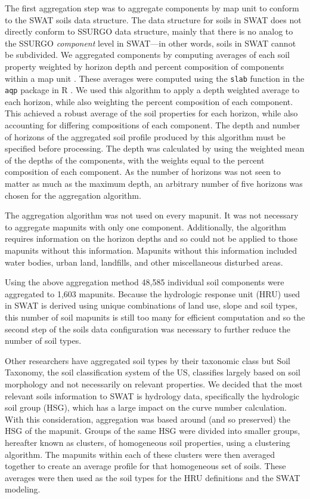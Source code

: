 The first aggregation step was to aggregate components by map unit to conform to
the SWAT soils data structure. The data structure for soils in SWAT does not
directly conform to SSURGO data structure, mainly that there is no analog to the
SSURGO \textit{component} level in SWAT---in other words, soils in SWAT cannot
be subdivided. We aggregated components by computing averages of each soil
property weighted by horizon depth and percent composition of components within
a map unit \cite{gatzke_aggregation_2011, beaudette_algorithms_2013}. These
averages were computed using the \texttt{slab} function in the \texttt{aqp}
package in R \cite{beaudette_algorithms_2013}. We used this algorithm to apply a
depth weighted average to each horizon, while also weighting the percent
composition of each component. This achieved a robust average of the soil
properties for each horizon, while also accounting for differing compositions of
each component. The depth and number of horizons of the aggregated soil profile
produced by this algorithm must be specified before processing. The depth was
calculated by using the weighted mean of the depths of the components, with the
weights equal to the percent composition of each component. As the number of
horizons was not seen to matter as much as the maximum depth, an arbitrary
number of five horizons was chosen for the aggregation algorithm.

The aggregation algorithm was not used on every mapunit. It was not necessary to
aggregate mapunits with only one component. Additionally, the algorithm requires
information on the horizon depths and so could not be applied to those mapunits
without this information. Mapunits without this information included water
bodies, urban land, landfills, and other miscellaneous disturbed areas.

Using the above aggregation method 48,585 individual soil components were
aggregated to 1,603 mapunits. Because the hydrologic response unit (HRU) used in
SWAT is derived using unique combinations of land use, slope and soil types,
this number of soil mapunits is still too many for efficient computation  and so
the second step of the soils data configuration was necessary to further reduce
the number of soil types. %

Other researchers have aggregated soil types by their taxonomic class
\citep{gatzke_aggregation_2011} but Soil Taxonomy, the soil classification
system of the US, classifies largely based on soil morphology and not
necessarily on relevant properties. We decided that the most relevant soils
information to SWAT is hydrology data, specifically the hydrologic soil group
(HSG), which has a large impact on the curve number calculation. With this
consideration, aggregation was based around (and so preserved) the HSG of the
mapunit. Groups of the same HSG were divided into smaller groups, hereafter
known as clusters, of homogeneous soil properties, using a clustering algorithm.
The mapunits within each of these clusters were then averaged together to create
an average profile for that homogeneous set of soils. These averages were then
used as the soil types for the HRU definitions and the SWAT modeling.

